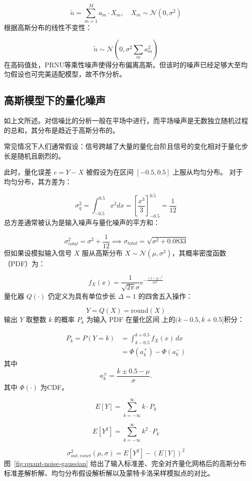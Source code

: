 \documentclass[journal]{IEEEtran}
\begin{document}
\[
 \tilde{n} = \sum_{m=1}^{M} a_m \cdot X_m, \quad X_m \sim \mathcal{N}(0, \sigma^2) 
\]
根据高斯分布的线性不变性： 

\[
 \tilde{n} \sim \mathcal{N}\left(0, \sigma^2 \sum_{m} a_m^2\right) 
\]
在高码值处，PRNU等乘性噪声使得分布偏离高斯。但该时的噪声已经足够大至均匀假设也可完美适配模型，故不作分析。

\subsection{高斯模型下的量化噪声}


如上文所述。对信噪比的分析一般在平场中进行，而平场噪声是无数独立随机过程的总和，其分布是趋近于高斯分布的。

常见情况下人们通常假设：信号跨越了大量的量化台阶且信号的变化相对于量化步长是随机且剧烈的。

此时，量化误差 $e = Y - X$ 被假设为在区间 $[-0.5, 0.5]$ 上服从均匀分布。 对于均匀分布，其方差为： 

\[
 \sigma_q^2 = \int_{-0.5}^{0.5} x^2 dx = \left[ \frac{x^3}{3} \right]_{-0.5}^{0.5} = \frac{1}{12} 
\]
总方差通常被认为是输入噪声与量化噪声的平方和： 

\[
 \sigma_{total}^2 = \sigma^2 + \frac{1}{12} \implies \sigma_{total} = \sqrt{\sigma^2 + 0.0833} 
\]
但如果设模拟输入信号 $X$ 服从高斯分布 $X \sim \mathcal{N}(\mu, \sigma^2)$，其概率密度函数（PDF）为： 

\[
f_X(x) = \frac{1}{\sqrt{2\pi}\sigma} e^{-\frac{(x-\mu)^2}{2\sigma^2}}
\]
量化器 $Q(\cdot)$ 仍定义为具有单位步长 $\Delta=1$ 的四舍五入操作： 

\[
Y = Q(X) = \text{round}(X)
\]
输出 $Y$ 取整数 $k$ 的概率 $P_k$ 为输入 PDF 在量化区间 上的$(k-0.5, k+0.5]$积分： 

\[
\begin{aligned}
P_k = P(Y=k)
&= \int_{k-0.5}^{k+0.5} f_X(x) \, dx \\
&= \Phi(a_k^{+}) - \Phi(a_k^{-})
\end{aligned}
\]
其中
\[
a_k^{\pm} = \frac{k \pm 0.5 - \mu}{\sigma}.
\]
其中 $\Phi(\cdot)$ 为CDF。

\[
E[Y] = \sum_{k=-\infty}^{\infty} k \cdot P_k
\]

\[
E[Y^2] = \sum_{k=-\infty}^{\infty} k^2 \cdot P_k
\]

\[
\sigma_{out, exact}^2(\mu, \sigma) = E[Y^2] - (E[Y])^2
\]
图~\ref{fig:quant-noise-gaussian} 给出了输入标准差、完全对齐量化网格后的高斯分布标准差解析解、均匀分布假设解析解以及蒙特卡洛采样模拟点的对比。
\end{document}
